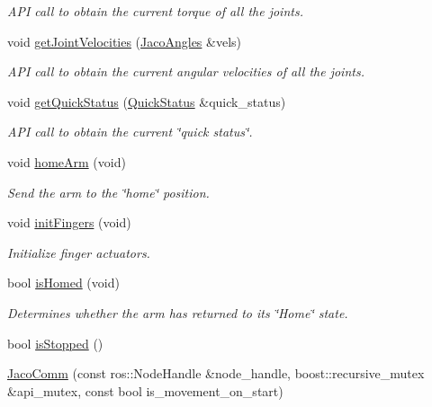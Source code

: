 \begin{DoxyCompactItemize}
\begin{DoxyCompactList}\small\item\em A\+PI call to obtain the current torque of all the joints. \end{DoxyCompactList}\item 
void \hyperlink{classjaco_1_1JacoComm_aa81b5cdf89bd2c7259be3638fdb4f75a}{get\+Joint\+Velocities} (\hyperlink{classjaco_1_1JacoAngles}{Jaco\+Angles} \&vels)
\begin{DoxyCompactList}\small\item\em A\+PI call to obtain the current angular velocities of all the joints. \end{DoxyCompactList}\item 
void \hyperlink{classjaco_1_1JacoComm_a29384597e710d4cbb4e1f2ae6b7d7e50}{get\+Quick\+Status} (\hyperlink{KinovaTypes_8h_df/d9d/structQuickStatus}{Quick\+Status} \&quick\+\_\+status)
\begin{DoxyCompactList}\small\item\em A\+PI call to obtain the current \char`\"{}quick status\char`\"{}. \end{DoxyCompactList}\item 
void \hyperlink{classjaco_1_1JacoComm_a38c69b22bc293afd3f27eff9179dec4c}{home\+Arm} (void)
\begin{DoxyCompactList}\small\item\em Send the arm to the \char`\"{}home\char`\"{} position. \end{DoxyCompactList}\item 
void \hyperlink{classjaco_1_1JacoComm_a787f049f83d8f5fa5a7c86ee6a1d0a11}{init\+Fingers} (void)
\begin{DoxyCompactList}\small\item\em Initialize finger actuators. \end{DoxyCompactList}\item 
bool \hyperlink{classjaco_1_1JacoComm_a0e7d5984a2c6ed956da7e07e6c97ba5f}{is\+Homed} (void)
\begin{DoxyCompactList}\small\item\em Determines whether the arm has returned to its \char`\"{}\+Home\char`\"{} state. \end{DoxyCompactList}\item 
bool \hyperlink{classjaco_1_1JacoComm_a872b8033cda5a9fe4ccdca2e89aa03d1}{is\+Stopped} ()
\item 
\hyperlink{classjaco_1_1JacoComm_acdf234ee7f30cf5ead4f41beb3481521}{Jaco\+Comm} (const ros\+::\+Node\+Handle \&node\+\_\+handle, boost\+::recursive\+\_\+mutex \&api\+\_\+mutex, const bool is\+\_\+movement\+\_\+on\+\_\+start)

\end{DoxyCompactItemize}
